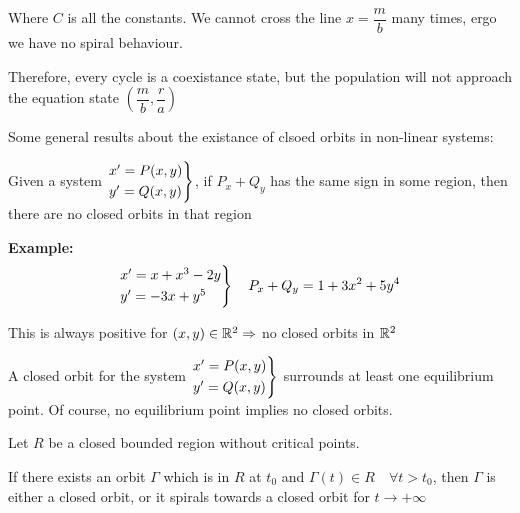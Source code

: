 \noindent Where $C$ is all the constants. We cannot cross the line $x = \dfrac{m}{b}$  many times, ergo we have no spiral behaviour.\par
\noindent Therefore, every cycle is a coexistance state, but the population will not approach the equation state $\left(\dfrac{m}{b}, \dfrac{r}{a}\right)$ 
\par\bigskip
\noindent Some general results about the existance of clsoed orbits in non-linear systems:
\par\bigskip
\begin{theo}{}
  Given a system $\begin{rcases*}x^{\prime}=P(x,y)\\y^{\prime} = Q(x,y)\end{rcases*}$, if $P_x+Q_y$ has the same sign in some region, then there are no closed orbits in that region
\end{theo}
\par\bigskip
\noindent\textbf{Example:}
\begin{equation*}
  \begin{gathered}
    \begin{rcases*}
      x^{\prime} = x+x^3-2y\\
      y^{\prime} = -3x+y^5
    \end{rcases*}\quad P_x+Q_y = 1+3x^2+5y^4
  \end{gathered}
\end{equation*}\par
\noindent This is always positive for $(x,y)\in\mathbb{R}^2\Rightarrow $ no closed orbits in $\mathbb{R}^2$
\par\bigskip
\begin{theo}[]{}
  A closed orbit for the system $\begin{rcases*}x^{\prime}=P(x,y)\\y^{\prime} = Q(x,y)\end{rcases*}$ surrounds at least one equilibrium point. Of course, no equilibrium point implies no closed orbits. 
\end{theo}
\par\bigskip
\begin{theo}{}
  Let $R$ be a closed bounded region without critical points.
  \par\bigskip
  \noindent If there exists an orbit $\Gamma$  which is in $R$ at $t_0$ and $\Gamma(t)\in R\quad\forall t>t_0$, then $\Gamma$ is either a closed orbit, or it spirals towards a closed orbit for $t\to+\infty$
\end{theo}

